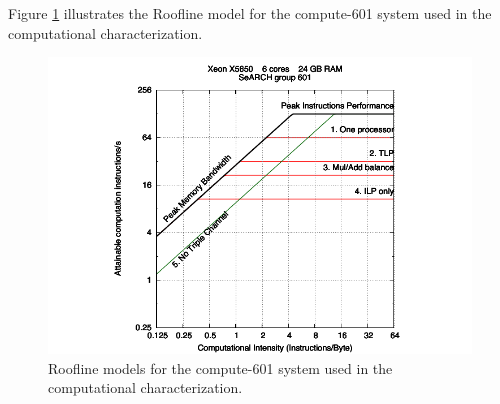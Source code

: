 Figure \ref{fig:Roofline601} illustrates the Roofline model for the compute-601 system used in the \ttDilepKinFit computational characterization.

\begin{figure}[!htp]
	\begin{center}
		\includegraphics[scale=0.7]{../../common/601.pdf}
		\caption{Roofline models for the compute-601 system used in the \ttDilepKinFit computational characterization.}
		\label{fig:Roofline601}
	\end{center}
\end{figure}

